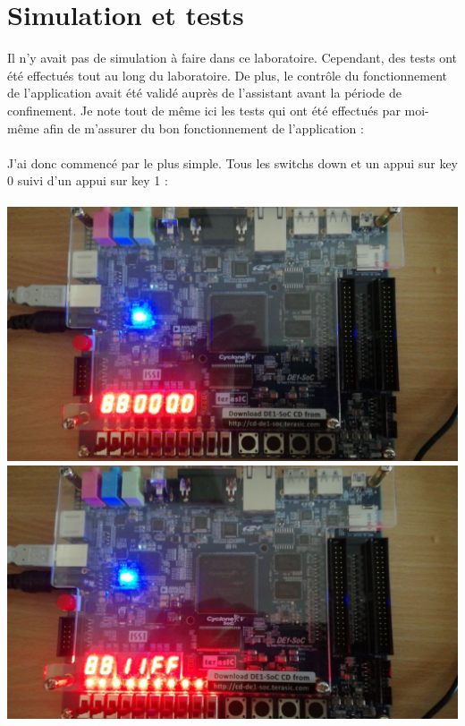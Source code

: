 \section{Simulation et tests}

Il n'y avait pas de simulation à faire dans ce laboratoire. Cependant, des tests ont été effectués tout au long du laboratoire. De plus, le contrôle du fonctionnement de l'application avait été validé auprès de l'assistant avant la période de confinement. Je note tout de même ici les tests qui ont été effectués par moi-même afin de m'assurer du bon fonctionnement de l'application : \\\\
J'ai donc commencé par le plus simple. Tous les switchs down et un appui sur key 0 suivi d'un appui sur key 1 : \\\\
\includegraphics[scale=0.3]{./images/appuiKey0SwitchDown.jpeg}
\includegraphics[scale=0.3]{./images/appuiKey1SwitchDown.jpeg}


